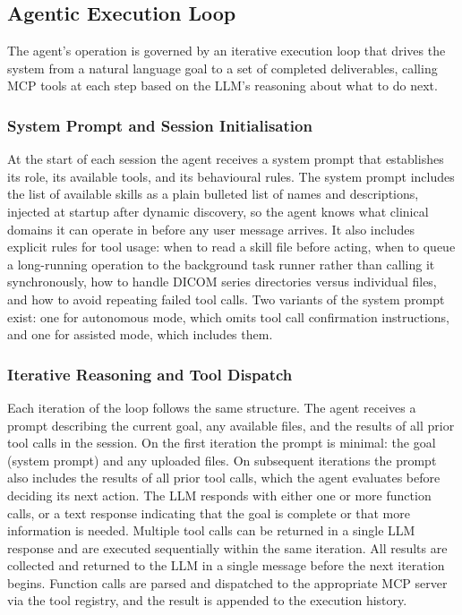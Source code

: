 \documentclass[conference]{IEEEtran}
\begin{document}
\subsection{Agentic Execution Loop}

The agent's operation is governed by an iterative execution loop that drives the system from a natural language goal to a set of completed deliverables, calling MCP tools at each step based on the LLM's reasoning about what to do next.

\subsubsection{System Prompt and Session Initialisation}

At the start of each session the agent receives a system prompt that establishes its role, its available tools, and its behavioural rules. The system prompt includes the list of available skills as a plain bulleted list of names and descriptions, injected at startup after dynamic discovery, so the agent knows what clinical domains it can operate in before any user message arrives.
It also includes explicit rules for tool usage: when to read a skill file before acting, when to queue a long-running operation to the background task runner rather than calling it synchronously, how to handle DICOM series directories versus individual files, and how to avoid repeating failed tool calls.
Two variants of the system prompt exist: one for autonomous mode, which omits tool call confirmation instructions, and one for assisted mode, which includes them.

\subsubsection{Iterative Reasoning and Tool Dispatch}

Each iteration of the loop follows the same structure. The agent receives a prompt describing the current goal, any available files, and the results of all prior tool calls in the session.
On the first iteration the prompt is minimal: the goal (system prompt) and any uploaded files.
On subsequent iterations the prompt also includes the results of all prior tool calls, which the agent evaluates before deciding its next action. The LLM responds with either one or more function calls, or a text response indicating that the goal is complete or that more information is needed. Multiple tool calls can be returned in a single LLM response and are executed sequentially within the same iteration. All results are collected and returned to the LLM in a single message before the next iteration begins. Function calls are parsed and dispatched to the appropriate MCP server via the tool registry, and the result is appended to the execution history.
\end{document}
